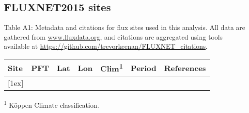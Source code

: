 \documentclass[12pt]{article}
\begin{document}
\begin{appendices}
  \section{FLUXNET2015 sites}\label{flux_sites}
  Table A1: Metadata and citations for flux sites used in this analysis. All data are gathered from \url{www.fluxdata.org}, and citations are aggregated using tools available at \url{https://github.com/trevorkeenan/FLUXNET_citations}.
  \begin{longtable}{l l l l l l l}
    \hline
    \textbf{Site} &
    \textbf{PFT} &
    \textbf{Lat} &
    \textbf{Lon} &
    \textbf{Clim\textsuperscript{1}} &
    \textbf{Period} &
    \textbf{References} \\
    [0.5ex]
    \hline
    
    [1ex]
    \hline
  \end{longtable}
  \textsuperscript{1}  K{\"o}ppen Climate classification.
\end{appendices}


\end{document}

